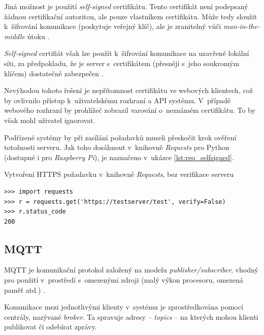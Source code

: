 Jiná možnost je použití \textit{self-signed} certifikátu. Tento certifikát není podepsaný žádnou certifikační autoritou, ale pouze vlastníkem certifikátu. Může tedy sloužit k~šifrování komunikace (poskytuje veřejný klíč), ale je zranitelný vůči \textit{man-in-the-middle} útoku \cite{cert_wallen}.

\textit{Self-signed} certifiát však lze použít k~šifrování komunikace na uzavřené lokální síti, za předpokladu, že je server s~certifikátem (přesněji s~jeho soukromým klíčem) dostatečně zabezpečen \cite{cert_wallen}. 

Nevýhodou tohoto řešení je nepřítomnost certifikátu ve webových klientech, což by ovlivnilo přístup k~uživatelskému rozhraní a API systému. V~případě webového rozhraní by prohlížeč zobrazil varování o~neznámém certifikátu. To by však mohl uživatel ignorovat. 

Podřízené systémy by při zasílání požadavků museli přeskočit krok ověření totožnosti serveru. Jak toho dosáhnout v~knihovně \textit{Requests} pro Python (dostupné i pro \textit{Raspberry Pi}), je naznačeno v~ukázce \ref{lst:req_selfsigned}.

\begin{listing}[htbp]
\caption{\label{lst:req_selfsigned} Vytvoření HTTPS požadavku v~knihovně \textit{Requests}, bez verifikace serveru}
\begin{verbatim}
>>> import requests
>>> r = requests.get('https://testserver/test', verify=False)
>>> r.status_code
200
\end{verbatim}
\end{listing}

\subsection{MQTT}

MQTT je komunikační protokol založený na modelu \textit{publisher/subscriber}, vhod\-ný pro použití v~prostředí s~omezenými zdroji (malý výkon procesoru, omezená paměť atd.) \cite{mqtt_valerie}.

Komunikace mezi jednotlivými klienty v~systému je zprostředkována pomocí centrály, nazývané \textit{broker}. Ta spravuje adresy -- \textit{topics} -- na kterých mohou klienti publikovat či odebírat zprávy. \cite{mqtt_eclipse}

